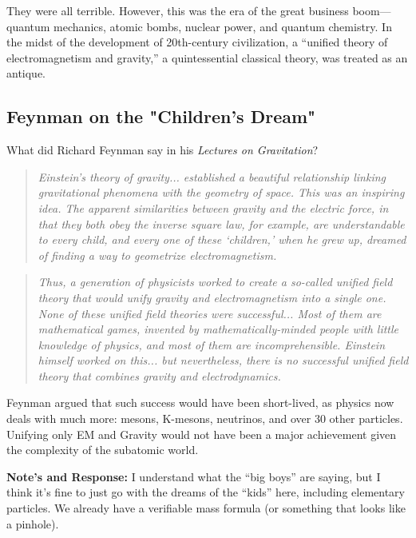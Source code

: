 \documentclass[11pt,a4paper,oneside]{article}
\newenvironment{fancyquote}
    {\begin{quote}\itshape\color{theoryblue!80!black}\guillemotleft\;}
    {\;\guillemotright\end{quote}}
\begin{document}
They were all terrible. However, this was the era of the great business boom—quantum mechanics, atomic bombs, nuclear power, and quantum chemistry. In the midst of the development of 20th-century civilization, a ``unified theory of electromagnetism and gravity,'' a quintessential classical theory, was treated as an antique.

\subsection{Feynman on the "Children's Dream"}

What did Richard Feynman say in his \textit{Lectures on Gravitation}?

\begin{fancyquote}
    Einstein's theory of gravity... established a beautiful relationship linking gravitational phenomena with the geometry of space. This was an inspiring idea. The apparent similarities between gravity and the electric force, in that they both obey the inverse square law, for example, are understandable to every child, and every one of these `children,' when he grew up, dreamed of finding a way to geometrize electromagnetism.
\end{fancyquote}

\begin{fancyquote}
    Thus, a generation of physicists worked to create a so-called unified field theory that would unify gravity and electromagnetism into a single one. None of these unified field theories were successful... Most of them are mathematical games, invented by mathematically-minded people with little knowledge of physics, and most of them are incomprehensible. Einstein himself worked on this... but nevertheless, there is no successful unified field theory that combines gravity and electrodynamics.
\end{fancyquote}

Feynman argued that such success would have been short-lived, as physics now deals with much more: mesons, K-mesons, neutrinos, and over 30 other particles. Unifying only EM and Gravity would not have been a major achievement given the complexity of the subatomic world.

\begin{reflectionbox}[title={Response to Feynman}]
\textbf{Note's and Response:} I understand what the ``big boys'' are saying, but I think it's fine to just go with the dreams of the ``kids'' here, including elementary particles. We already have a verifiable mass formula (or something that looks like a pinhole).
\end{reflectionbox}
\end{document}
